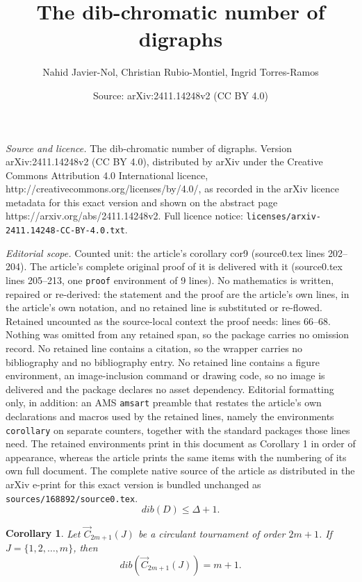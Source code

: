 \documentclass[10pt,a4paper]{amsart}
\title{The dib-chromatic number of digraphs}
\author{Nahid Javier-Nol, Christian Rubio-Montiel, Ingrid Torres-Ramos}
\date{Source: arXiv:2411.14248v2 (CC BY 4.0)}
\newtheorem{corollary}{Corollary}
\begin{document}
\maketitle

\noindent\emph{Source and licence.} The dib-chromatic number of digraphs. Version arXiv:2411.14248v2 (CC BY 4.0), distributed by arXiv under the Creative Commons Attribution 4.0 International licence, http://creativecommons.org/licenses/by/4.0/, as recorded in the arXiv licence metadata for this exact version and shown on the abstract page https://arxiv.org/abs/2411.14248v2. Full licence notice: \texttt{licenses/arxiv-2411.14248-CC-BY-4.0.txt}.\par\smallskip

\noindent\textit{Editorial scope.} Counted unit: the article's corollary cor9 (source0.tex lines 202--204). The article's complete original proof of it is delivered with it (source0.tex lines 205--213, one \texttt{proof} environment of 9 lines). No mathematics is written, repaired or re-derived: the statement and the proof are the article's own lines, in the article's own notation, and no retained line is substituted or re-flowed.  Retained uncounted as the source-local context the proof needs: lines 66--68.  Nothing was omitted from any retained span, so the package carries no omission record.  No retained line contains a citation, so the wrapper carries no bibliography and no bibliography entry.  No retained line contains a figure environment, an image-inclusion command or drawing code, so no image is delivered and the package declares no asset dependency.  Editorial formatting only, in addition: an AMS \texttt{amsart} preamble that restates the article's own declarations and macros used by the retained lines, namely the environments \texttt{corollary} on separate counters, together with the standard packages those lines need.  The retained environments print in this document as Corollary 1 in order of appearance, whereas the article prints the same items with the numbering of its own full document.  The complete native source of the article as distributed in the arXiv e-print for this exact version is bundled unchanged as \texttt{sources/168892/source0.tex}.
\begin{equation}\label{eq2}
    dib(D) \leq \Delta+1.
\end{equation}

\begin{corollary}\label{cor9}
Let $\overrightarrow{C}_{2m+1}(J)$ be a circulant tournament of order $2m+1$. If $J=\{1,2,\dots,m\}$, then \[dib(\overrightarrow{C}_{2m+1}(J))=m+1.\]
\end{corollary}
\end{document}
